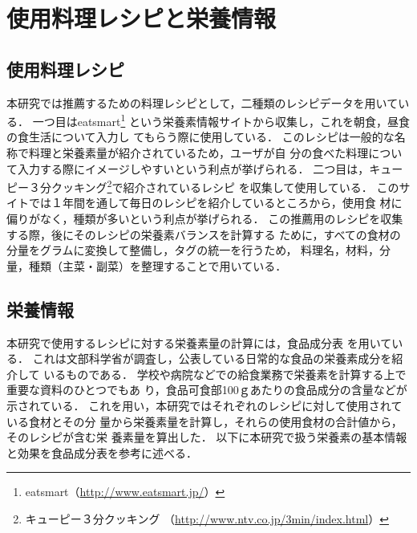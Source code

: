 \documentclass[11pt,titlepage,uplatex]{ujreport}
\begin{document}
\section{使用料理レシピと栄養情報}
\subsection{使用料理レシピ}
本研究では推薦するための料理レシピとして，二種類のレシピデータを用いてい
る．
一つ目はeatsmart\footnote{eatsmart（\url{http://www.eatsmart.jp/}）}
という栄養素情報サイトから収集し，これを朝食，昼食の食生活について入力し
てもらう際に使用している．
このレシピは一般的な名称で料理と栄養素量が紹介されているため，ユーザが自
分の食べた料理について入力する際にイメージしやすいという利点が挙げられる．
二つ目は，キューピー３分クッキング\footnote{キューピー３分クッキング
（\url{http://www.ntv.co.jp/3min/index.html}）}で紹介されているレシピ
を収集して使用している．
このサイトでは１年間を通して毎日のレシピを紹介しているところから，使用食
材に偏りがなく，種類が多いという利点が挙げられる．
この推薦用のレシピを収集する際，後にそのレシピの栄養素バランスを計算する
ために，すべての食材の分量をグラムに変換して整備し，タグの統一を行うため，
料理名，材料，分量，種類（主菜・副菜）を整理することで用いている．

\subsection{栄養情報}
本研究で使用するレシピに対する栄養素量の計算には，食品成分表
\cite{jikkyo10} を用いている．
これは文部科学省が調査し，公表している日常的な食品の栄養素成分を紹介して
いるものである．
学校や病院などでの給食業務で栄養素を計算する上で重要な資料のひとつでもあ
り，食品可食部100ｇあたりの食品成分の含量などが示されている．
これを用い，本研究ではそれぞれのレシピに対して使用されている食材とその分
量から栄養素量を計算し，それらの使用食材の合計値から，そのレシピが含む栄
養素量を算出した．
以下に本研究で扱う栄養素の基本情報と効果を食品成分表を参考に述べる．
\end{document}
